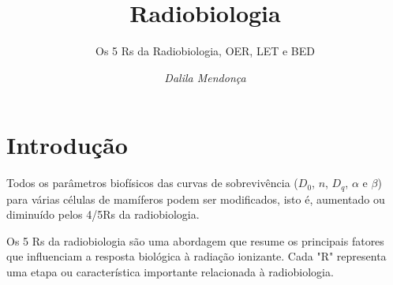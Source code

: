 \documentclass[11pt,a4paper]{article}
\title{\LobsterTwo\Huge{Radiobiologia}}
\author{\LobsterTwo\Large{Os 5 Rs da Radiobiologia, OER, LET e BED}\nocite{*}}
\date{\LobsterTwo\textit{Dalila Mendonça}}
\begin{document}
	\maketitle

\section{Introdução}

  
	Todos os parâmetros biofísicos das curvas de sobrevivência ($D_0$, $n$, $D_q$, $\alpha$ e $\beta$) para várias células de mamíferos podem ser modificados, isto é, aumentado ou diminuído pelos 4/5Rs da radiobiologia. 

	Os 5 Rs da radiobiologia são uma abordagem que resume os principais fatores que influenciam a resposta biológica à radiação ionizante. Cada "R" representa uma etapa ou característica importante relacionada à radiobiologia.
\end{document}
